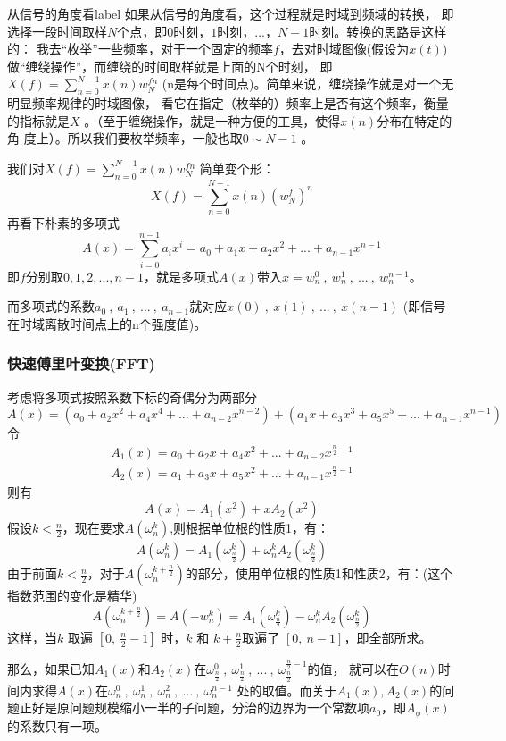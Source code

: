 \begin{definition}{从信号的角度看}{label}
如果从信号的角度看，这个过程就是{\heiti 时域到频域的转换}， 即选择一段时间取样$N$个点，即$0$时刻，$1$时刻，...，$N-1$时刻。转换的思路是这样的：
我去“枚举”一些频率，对于一个固定的频率$f$，去对{\heiti 时域图像(假设为$x(t)$)}做“缠绕操作”，而缠绕的时间取样就是上面的N个时刻，
即$X(f)=\sum_{n=0}^{N-1}x(n)w_N^{fn}$  (n是每个时间点)。简单来说，缠绕操作就是对一个{\heiti 无明显频率规律}的时域图像，
看它在指定（枚举的）频率上是否有这个频率，衡量的指标就是$X$ 。（至于缠绕操作，就是一种方便的工具，使得$x(n)$分布在特定的角
度上）。所以我们要枚举频率，一般也取$0\sim N-1$  。

我们对$X(f)=\sum_{n=0}^{N-1}x(n)w_N^{fn}$   简单变个形：
$$
X(f)=\sum_{n=0}^{N-1}x(n)(w_N^{f})^n
$$
再看下朴素的多项式
$$
A(x)=\sum_{i=0}^{n-1}a_ix^i=a_0+a_1x+a_2x^2+...+a_{n-1}x^{n-1}
$$
即$f$分别取$0,1,2,...,n-1$，就是多项式$A(x)$带入$x=w_n^0\ ,\ w_n^1\ ,\ ...\ ,\ w_n^{n-1}$。

而多项式的系数$a_0\ ,\ a_1\ ,\ ...\ ,\ a_{n-1}$就对应$x(0)\ ,\ x(1)\ ,\ ...\ ,\ x(n-1)$ ({\heiti 即信号在时域离散时间点上的n个强度值})。

\end{definition}

\subsubsection{快速傅里叶变换(FFT)}
考虑将多项式按照系数下标的奇偶分为两部分
$$
A(x)=(a_0+a_2x^2+a_4x^4+...+a_{n-2}x^{n-2})+(a_1x+a_3x^3+a_5x^5+...+a_{n-1}x^{n-1})
$$
令
\begin{align*}
A_1(x)=a_0+a_2x+a_4x^2+...+a_{n-2}x^{\frac{n}{2}-1}  \\
A_2(x)=a_1+a_3x+a_5x^2+...+a_{n-1}x^{\frac{n}{2}-1}
\end{align*}
则有
$$
A(x)=A_1(x^2)+xA_2(x^2)
$$
假设$k<\frac{n}{2}$，现在要求$A(\omega_n^k)$,则根据单位根的性质1，有：
$$
A(\omega_n^k)=A_1(\omega_\frac{n}{2}^{k})+\omega_n^kA_2(\omega_\frac{n}{2}^{k})
$$
由于前面$k<\frac{n}{2}$，对于$A(\omega_n^{k+\frac{n}{2}})$的部分，使用单位根的性质1和性质2，有：(这个指数范围的变化是精华)
$$
A(\omega_n^{k+\frac{n}{2}})=A(-w_n^k)=A_1(\omega_\frac{n}{2}^{k})-\omega_n^kA_2(\omega_\frac{n}{2}^{k})
$$
这样，当$ k$ 取遍 $[0,\ \frac{n}{2}-1]$ 时，$k$ 和 $k + \frac{n}{2}$取遍了 $[0,\ n-1]$，即全部所求。

那么，如果已知$A_1(x)$和$A_2(x)$在$\omega_\frac{n}{2}^0\ ,\ \omega_\frac{n}{2}^1\ ,\ ...\ ,\ \omega_\frac{n}{2}^{\frac{n}{2}-1}$的值，
就可以在$O(n)$时间内求得$A(x)$在$\omega_n^0\ ,\ \omega_n^1\ ,\ \omega_n^2\ ,\ ...\ ,\ \omega_n^{n-1}$ 处的取值。而{\heiti 关于$A_1(x),A_2(x)$的问题正好是原问题规模缩小一半的子问题}，分治的边界为一个常数项$a_0$，即$A_\phi(x)$的系数只有一项。

